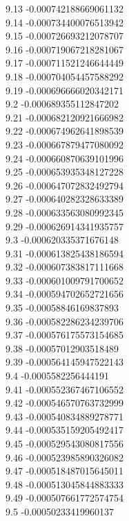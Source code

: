 {9.13	-0.000742188669061132\\
9.14	-0.000734400076513942\\
9.15	-0.000726693212078707\\
9.16	-0.000719067218281067\\
9.17	-0.000711521246644449\\
9.18	-0.000704054457588292\\
9.19	-0.000696666020342171\\
9.2	-0.000689355112847202\\
9.21	-0.000682120921666982\\
9.22	-0.000674962641898539\\
9.23	-0.000667879477080092\\
9.24	-0.000660870639101996\\
9.25	-0.000653935348127228\\
9.26	-0.000647072832492794\\
9.27	-0.000640282328633389\\
9.28	-0.000633563080992345\\
9.29	-0.000626914341935757\\
9.3	-0.000620335371676148\\
9.31	-0.000613825438186594\\
9.32	-0.000607383817111668\\
9.33	-0.000601009791700652\\
9.34	-0.000594702652721656\\
9.35	-0.00058846169837893\\
9.36	-0.000582286234239706\\
9.37	-0.000576175573154685\\
9.38	-0.00057012903518489\\
9.39	-0.000564145947522143\\
9.4	-0.0005582256444191\\
9.41	-0.000552367467106552\\
9.42	-0.000546570763732999\\
9.43	-0.000540834889278771\\
9.44	-0.000535159205492417\\
9.45	-0.000529543080817556\\
9.46	-0.000523985890326082\\
9.47	-0.000518487015645011\\
9.48	-0.000513045844883333\\
9.49	-0.000507661772574754\\
9.5	-0.00050233419960137\\
}
